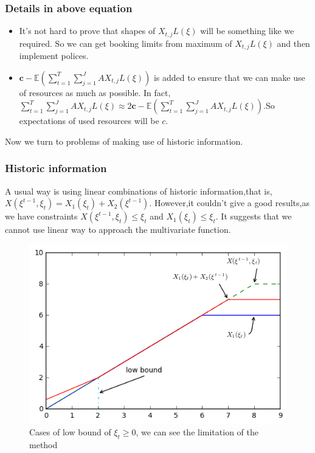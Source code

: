 \documentclass{beamer}
\begin{document}
\begin{frame}
\frametitle{Details in above equation}
\begin{itemize}
\item It's not hard to prove that shapes of $X_{t,j} L(\xi)$ will be something like we required. So we can get booking limits from maximum of $X_{t,j} L(\xi)$ and then implement polices.
\item $\mathbf{c} - \mathbb{E}(\sum\limits_{t=1}^T \sum\limits^J_{j=1} A X_{t,j} L(\xi))$ is added to ensure that we can make use of resources as much as possible. In fact, $\sum\limits_{t=1}^T\sum\limits^J_{j=1} A X_{t,j} L(\xi) \approx 2\mathbf{c} - \mathbb{E}(\sum\limits_{t=1}^T \sum\limits^J_{j=1} A X_{t,j} L(\xi))$.So expectations of used resources will be $c$.
\end{itemize}
Now we turn to problems of making use of historic information.
\end{frame}
\begin{frame}
\frametitle{Historic information}
A usual way is using linear combinations of historic information,that is, $X(\xi^{t-1},\xi_t)=X_1(\xi_t)+X_2(\xi^{t-1})$. However,it couldn't give a good results,as we have constraints $X(\xi^{t-1},\xi_t) \leq \xi_t$ and $X_1(\xi_t) \leq \xi_t$. It suggests that we cannot use linear way to approach the multivariate function.

\begin{figure}
\centering
\includegraphics[width=.5\textwidth]{plus.png}
\caption{Cases of low bound of $\xi_t \geq 0$, we can see the limitation of the method}
\end{figure}
\end{frame}
\end{document}
